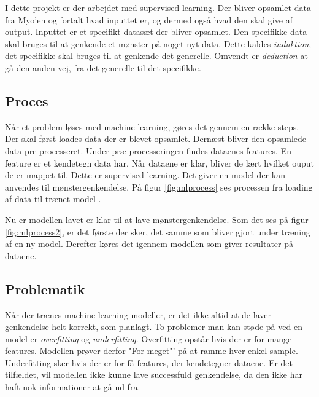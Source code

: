 I dette projekt er der arbejdet med supervised learning. Der bliver opsamlet data fra Myo'en og fortalt hvad inputtet er, og dermed også hvad den skal give af output. Inputtet er et specifikt datasæt der bliver opsamlet. Den specifikke data skal bruges til at genkende et mønster på noget nyt data. Dette kaldes \textit{induktion}, det specifikke skal bruges til at genkende det generelle. Omvendt er \textit{deduction} at gå den anden vej, fra det generelle til det specifikke.

\subsection{Proces}
Når et problem løses med machine learning, gøres det gennem en række steps. Der skal først loades data der er blevet opsamlet. Dernæst bliver den opsamlede data pre-processeret. Under præ-processeringen findes dataenes features. En feature er et kendetegn data har. Når dataene er klar, bliver de lært hvilket ouput de er mappet til. Dette er supervised learning. Det giver en model der kan anvendes til mønstergenkendelse. På figur \ref{fig:mlprocess} ses processen fra loading af data til trænet model \citep{MLMadeEasy}.


Nu er modellen lavet er klar til at lave mønstergenkendelse. Som det ses på figur \ref{fig:mlprocess2}, er det første der sker, det samme som bliver gjort under træning af en ny model. Derefter køres det igennem modellen som giver resultater på dataene.


\subsection{Problematik}
Når der trænes machine learning modeller, er det ikke altid at de laver genkendelse helt korrekt, som planlagt. To problemer man kan støde på ved en model er \textit{overfitting} og \textit{underfitting}. Overfitting opstår hvis der er for mange features. Modellen prøver derfor "For meget"' på at ramme hver enkel sample. Underfitting sker hvis der er for få features, der kendetegner dataene. Er det tilfældet, vil modellen ikke kunne lave successfuld genkendelse, da den ikke har haft nok informationer at gå ud fra.

